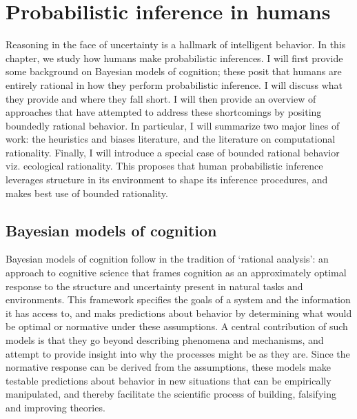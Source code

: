

\chapter{Probabilistic inference in humans}
\label{chap:psych}

Reasoning in the face of uncertainty is a hallmark of intelligent behavior. In this chapter, we study how humans make probabilistic inferences. I will first provide some background on Bayesian models of cognition; these posit that humans are entirely rational in how they perform probabilistic inference. I will discuss what they provide and where they fall short. I will then provide an overview of approaches that have attempted to address these shortcomings by positing boundedly rational behavior. In particular, I will summarize two major lines of work: the heuristics and biases literature, and the literature on computational rationality. Finally, I will introduce a special case of bounded rational behavior viz. ecological rationality. This proposes that human probabilistic inference leverages structure in its environment to shape its inference procedures, and makes best use of bounded rationality.

\section{Bayesian models of cognition}
Bayesian models of cognition follow in the tradition of `rational analysis'\cite{shepard1987toward, anderson1990adaptive}: an approach to cognitive science that frames cognition as an approximately optimal response to the structure and uncertainty present in natural tasks and environments. This framework specifies the goals of a system and the information it has access to, and maks predictions about behavior by determining what would be optimal or normative under these assumptions. A central contribution of such models is that they go beyond describing phenomena and mechanisms, and attempt to provide insight into why the processes might be as they are. Since the normative response can be derived from the assumptions, these models make testable predictions about behavior in new situations that can be empirically manipulated, and thereby facilitate the scientific process of building, falsifying and improving theories.

